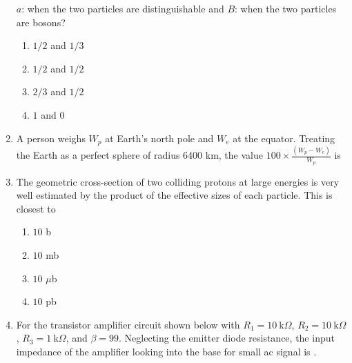\documentclass{article}
\newcommand{\brak}[1]{\left( #1 \right)}
\begin{document}
\begin{enumerate}
$a$: when the two particles are distinguishable and $B$: when the two particles are bosons?  

\begin{enumerate}
    \item  $1/2$ and  $1/3$
    \item  $1/2$ and $1/2$
    \item  $2/3$ and  $1/2$
    \item  $1$ and  $0$
\end{enumerate}

\item A person weighs $W_p$ at Earth's north pole and $W_e$ at the equator. Treating the Earth as a perfect sphere of radius 6400 km, the value $100 \times \frac{\brak{W_p - W_e}}{W_p}$ is 

\item The geometric cross-section of two colliding protons at large energies is very well estimated by the product of the effective sizes of each particle. This is closest  
 to

\begin{enumerate}
    \item $10$ b
    \item $10$ mb
    \item $10$ $\mu$b
    \item $10$ pb
\end{enumerate}

\item For the transistor amplifier circuit shown below with $R_1 = 10~\text{k}\Omega$, $R_2 = 10~\text{k}\Omega$, $R_3 = 1~\text{k}\Omega$, and $\beta = 99$. Neglecting the emitter diode resistance, the input impedance of the amplifier looking into the base for small ac  
 signal is . 

 \begin{figure}[!ht]
\centering
{}%

\label{fig:my_label}
\end{figure}

\end{enumerate}
\end{document}
